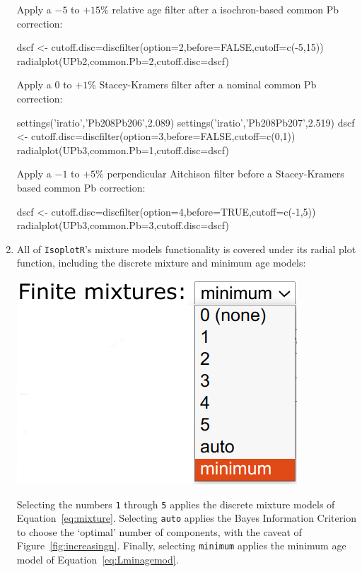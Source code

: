 \begin{refsection}
\begin{enumerate}
\noindent Apply a $-5$ to $+15$\% relative age filter after a
  isochron-based common Pb correction:
\begin{script}
dscf <- cutoff.disc=discfilter(option=2,before=FALSE,cutoff=c(-5,15))
radialplot(UPb2,common.Pb=2,cutoff.disc=dscf)
\end{script}

\noindent Apply a $0$ to $+1$\% Stacey-Kramers filter after a nominal
  common Pb correction:
\begin{script}
settings('iratio','Pb208Pb206',2.089)
settings('iratio','Pb208Pb207',2.519)
dscf <- cutoff.disc=discfilter(option=3,before=FALSE,cutoff=c(0,1))
radialplot(UPb3,common.Pb=1,cutoff.disc=dscf)
\end{script}

\noindent Apply a $-1$ to $+5$\% perpendicular Aitchison filter before a
  Stacey-Kramers based common Pb correction:
\begin{script}
dscf <- cutoff.disc=discfilter(option=4,before=TRUE,cutoff=c(-1,5))
radialplot(UPb3,common.Pb=3,cutoff.disc=dscf)
\end{script}

\item All of \texttt{IsoplotR}'s mixture models functionality is
  covered under its radial plot function, including the discrete
  mixture and minimum age models:

\noindent\begin{minipage}[t]{.3\linewidth}
\strut\vspace*{-\baselineskip}\newline
\includegraphics[width=\linewidth]{../figures/UPbRadialMinagemod.png}
\end{minipage}
\begin{minipage}[t]{.7\linewidth}
  Selecting the numbers \texttt{1} through \texttt{5} applies the
  discrete mixture models of Equation~\ref{eq:mixture}. Selecting
  \texttt{auto} applies the Bayes Information Criterion to choose the
  `optimal' number of components, with the caveat of
  Figure~\ref{fig:increasingn}. Finally, selecting \texttt{minimum}
  applies the minimum age model of Equation~\ref{eq:Lminagemod}.
\end{minipage}


\end{enumerate}
\end{refsection}
